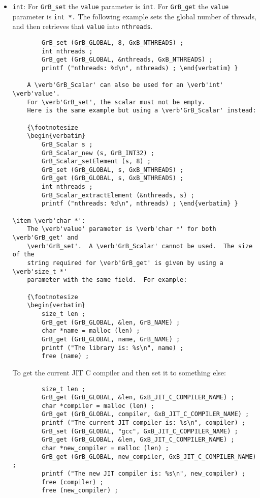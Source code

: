 \begin{itemize}
\item \verb'int': 
    For \verb'GrB_set' the \verb'value' parameter is \verb'int'.
    For \verb'GrB_get' the \verb'value' parameter is \verb'int *.'
    The following example sets the global number of threads, and then
    retrieves that \verb'value' into \verb'nthreads'.

    {\footnotesize
    \begin{verbatim}
        GrB_set (GrB_GLOBAL, 8, GxB_NTHREADS) ;
        int nthreads ;
        GrB_get (GrB_GLOBAL, &nthreads, GxB_NTHREADS) ;
        printf ("nthreads: %d\n", nthreads) ; \end{verbatim} }

    A \verb'GrB_Scalar' can also be used for an \verb'int' \verb'value'.
    For \verb'GrB_set', the scalar must not be empty.
    Here is the same example but using a \verb'GrB_Scalar' instead:

    {\footnotesize
    \begin{verbatim}
        GrB_Scalar s ;
        GrB_Scalar_new (s, GrB_INT32) ;
        GrB_Scalar_setElement (s, 8) ;
        GrB_set (GrB_GLOBAL, s, GxB_NTHREADS) ;
        GrB_get (GrB_GLOBAL, s, GxB_NTHREADS) ;
        int nthreads ;
        GrB_Scalar_extractElement (&nthreads, s) ;
        printf ("nthreads: %d\n", nthreads) ; \end{verbatim} }

\item \verb'char *':
    The \verb'value' parameter is \verb'char *' for both \verb'GrB_get' and
    \verb'GrB_set'.  A \verb'GrB_Scalar' cannot be used.  The size of the
    string required for \verb'GrB_get' is given by using a \verb'size_t *'
    parameter with the same field.  For example:

    {\footnotesize
    \begin{verbatim}
        size_t len ;
        GrB_get (GrB_GLOBAL, &len, GrB_NAME) ;
        char *name = malloc (len) ;
        GrB_get (GrB_GLOBAL, name, GrB_NAME) ;
        printf ("The library is: %s\n", name) ;
        free (name) ; \end{verbatim} }

    To get the current JIT C compiler and then set it to something else:

    {\footnotesize
    \begin{verbatim}
        size_t len ;
        GrB_get (GrB_GLOBAL, &len, GxB_JIT_C_COMPILER_NAME) ;
        char *compiler = malloc (len) ;
        GrB_get (GrB_GLOBAL, compiler, GxB_JIT_C_COMPILER_NAME) ;
        printf ("The current JIT compiler is: %s\n", compiler) ;
        GrB_set (GrB_GLOBAL, "gcc", GxB_JIT_C_COMPILER_NAME) ;
        GrB_get (GrB_GLOBAL, &len, GxB_JIT_C_COMPILER_NAME) ;
        char *new_compiler = malloc (len) ;
        GrB_get (GrB_GLOBAL, new_compiler, GxB_JIT_C_COMPILER_NAME) ;
        printf ("The new JIT compiler is: %s\n", new_compiler) ;
        free (compiler) ;
        free (new_compiler) ; \end{verbatim} }


\end{itemize}
